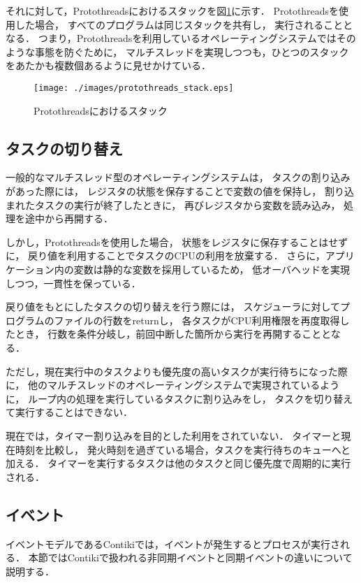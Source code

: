 それに対して，Protothreadsにおけるスタックを図\ref{fig:protothreads_stack}に示す．
Protothreadsを使用した場合，
すべてのプログラムは同じスタックを共有し，
実行されることとなる．
つまり，Protothreadsを利用しているオペレーティングシステムではそのような事態を防ぐために，
マルチスレッドを実現しつつも，ひとつのスタックをあたかも複数個あるように見せかけている．
\begin{figure}[htbp]
 \begin{center}
  \texttt{[image: ./images/protothreads\_stack.eps]}
 \end{center}
 \caption{Protothreadsにおけるスタック}
 \label{fig:protothreads_stack}
\end{figure}


\subsection{タスクの切り替え}
一般的なマルチスレッド型のオペレーティングシステムは，
タスクの割り込みがあった際には，
レジスタの状態を保存することで変数の値を保持し，
割り込まれたタスクの実行が終了したときに，
再びレジスタから変数を読み込み，
処理を途中から再開する．

しかし，Protothreadsを使用した場合，
状態をレジスタに保存することはせずに，
戻り値を利用することでタスクのCPUの利用を放棄する．
さらに，アプリケーション内の変数は静的な変数を採用しているため，
低オーバヘッドを実現しつつ，一貫性を保っている．

戻り値をもとにしたタスクの切り替えを行う際には，
スケジューラに対してプログラムのファイルの行数をreturnし，
各タスクがCPU利用権限を再度取得したとき，
行数を条件分岐し，前回中断した箇所から実行を再開することとなる．

ただし，現在実行中のタスクよりも優先度の高いタスクが実行待ちになった際に，
他のマルチスレッドのオペレーティングシステムで実現されているように，
ループ内の処理を実行しているタスクに割り込みをし，
タスクを切り替えて実行することはできない．

現在では，タイマー割り込みを目的とした利用をされていない．
タイマーと現在時刻を比較し，
発火時刻を過ぎている場合，タスクを実行待ちのキューへと加える．
タイマーを実行するタスクは他のタスクと同じ優先度で周期的に実行される．

\subsection{イベント}
イベントモデルであるContikiでは，イベントが発生するとプロセスが実行される．
本節ではContikiで扱われる非同期イベントと同期イベントの違いについて説明する．


